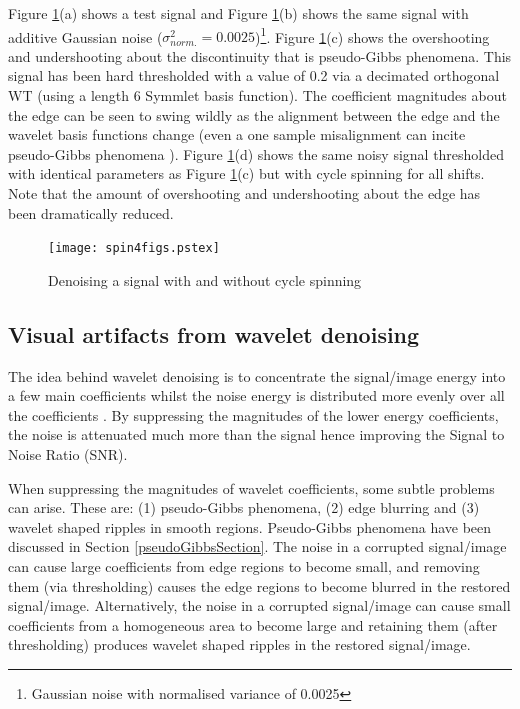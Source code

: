 \documentclass[12pt]{report}
\begin{document}
Figure \ref{signalExample}(a) shows a test signal and Figure \ref{signalExample}(b) shows the same
signal with additive Gaussian noise ($\sigma_{norm.}^{2} = 0.0025$)\footnote{Gaussian noise with 
normalised variance of 0.0025}.
Figure \ref{signalExample}(c) shows the overshooting and undershooting about the discontinuity that is
pseudo-Gibbs phenomena. This signal has been hard thresholded with a value of 0.2 via a decimated orthogonal
WT (using a length 6 Symmlet basis function).
The coefficient magnitudes about the edge can be seen to swing wildly as the alignment between the 
edge and the wavelet basis functions change (even a one sample misalignment can incite pseudo-Gibbs phenomena \cite{choi}).
Figure \ref{signalExample}(d) shows the same noisy signal thresholded with identical parameters as Figure \ref{signalExample}(c) 
but with cycle spinning for all shifts. Note that the amount of overshooting and undershooting 
about the edge has been dramatically reduced. 
\begin{figure}[htb]
	\begin{center}
	\texttt{[image: spin4figs.pstex]}
	\caption{Denoising a signal with and without cycle spinning}
	\label{signalExample}
	\end{center}
\end{figure}



\subsection{Visual artifacts from wavelet denoising}
The idea behind wavelet denoising is to concentrate the signal/image energy into a few main coefficients
whilst the noise energy is distributed more evenly over all the coefficients \cite{kings}.
By suppressing the magnitudes of the lower energy coefficients, the noise is attenuated much more than the
signal hence improving the Signal to Noise Ratio (SNR). 

When suppressing the magnitudes of wavelet coefficients, some subtle problems \cite{choi} can arise.
These are: (1) pseudo-Gibbs phenomena, (2) edge blurring and (3) wavelet shaped ripples in smooth regions.
Pseudo-Gibbs phenomena have been discussed in Section \ref{pseudoGibbsSection}.
The noise in a corrupted signal/image can cause large coefficients from edge regions 
to become small, and removing them (via thresholding) causes the edge regions to become blurred
in the restored signal/image.
Alternatively, the noise in a corrupted signal/image can cause small coefficients from a 
homogeneous area to become large and retaining them (after thresholding) produces wavelet shaped
ripples in the restored signal/image.
\end{document}
